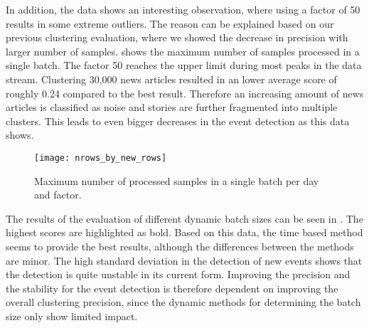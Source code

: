 In addition, the data shows an interesting observation, where using a factor of 50 results in some extreme outliers.
The reason can be explained based on our previous clustering evaluation,
where we showed the decrease in precision with larger number of samples.
 shows the maximum number of samples processed in a single batch.
The factor 50 reaches the upper limit during most peaks in the data stream.
Clustering 30,000 news articles resulted in an lower average score of roughly 0.24 compared to the best result.
Therefore an increasing amount of news articles is classified as noise and stories
are further fragmented into multiple clusters.
This leads to even bigger decreases in the event detection as this data shows.

\begin{figure}[h]
    \centering
    \texttt{[image: nrows\_by\_new\_rows]}
    \caption{Maximum number of processed samples in a single batch per day and factor.}
    \label{fig:nrows_by_new_rows}
 \end{figure}

The results of the evaluation of different dynamic batch sizes can be seen in .
The highest scores are highlighted as bold.
Based on this data, the time based method seems to provide the best results,
although the differences between the methods are minor.
The high standard deviation in the detection of new events shows
that the detection is quite unstable in its current form.
Improving the precision and the stability for the event detection
is therefore dependent on improving the overall clustering precision,
since the dynamic methods for determining the batch size only show limited impact.

\begin{table}[h]
    \centering
    \caption{Final scores obtained by each method for setting the batch size.}
    \label{tab:batch_size_methods}
\end{table}

